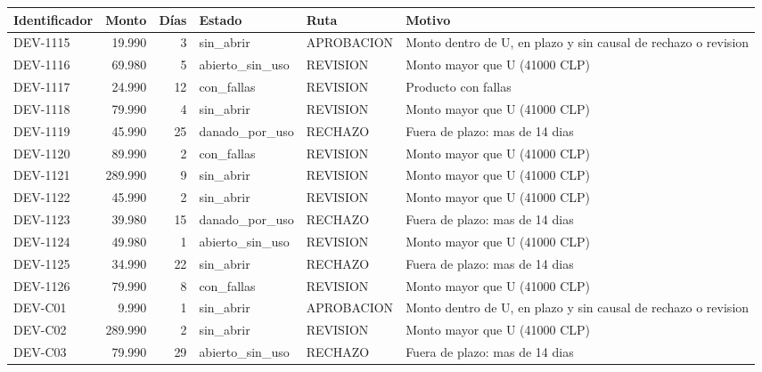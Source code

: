 \documentclass{article}
\begin{document}
\begin{center}
\footnotesize
\begin{tabular}{lrrllp{4.4cm}}
\toprule
Identificador & Monto & Días & Estado & Ruta & Motivo \\
\midrule
DEV-1115 & 19.990 & 3 & sin\_abrir & APROBACION & Monto dentro de U, en plazo y sin causal de rechazo o revision \\
DEV-1116 & 69.980 & 5 & abierto\_sin\_uso & REVISION & Monto mayor que U (41000 CLP) \\
DEV-1117 & 24.990 & 12 & con\_fallas & REVISION & Producto con fallas \\
DEV-1118 & 79.990 & 4 & sin\_abrir & REVISION & Monto mayor que U (41000 CLP) \\
DEV-1119 & 45.990 & 25 & danado\_por\_uso & RECHAZO & Fuera de plazo: mas de 14 dias \\
DEV-1120 & 89.990 & 2 & con\_fallas & REVISION & Monto mayor que U (41000 CLP) \\
DEV-1121 & 289.990 & 9 & sin\_abrir & REVISION & Monto mayor que U (41000 CLP) \\
DEV-1122 & 45.990 & 2 & sin\_abrir & REVISION & Monto mayor que U (41000 CLP) \\
DEV-1123 & 39.980 & 15 & danado\_por\_uso & RECHAZO & Fuera de plazo: mas de 14 dias \\
DEV-1124 & 49.980 & 1 & abierto\_sin\_uso & REVISION & Monto mayor que U (41000 CLP) \\
DEV-1125 & 34.990 & 22 & sin\_abrir & RECHAZO & Fuera de plazo: mas de 14 dias \\
DEV-1126 & 79.990 & 8 & con\_fallas & REVISION & Monto mayor que U (41000 CLP) \\
DEV-C01 & 9.990 & 1 & sin\_abrir & APROBACION & Monto dentro de U, en plazo y sin causal de rechazo o revision \\
DEV-C02 & 289.990 & 2 & sin\_abrir & REVISION & Monto mayor que U (41000 CLP) \\
DEV-C03 & 79.990 & 29 & abierto\_sin\_uso & RECHAZO & Fuera de plazo: mas de 14 dias \\
\bottomrule
\end{tabular}
\end{center}
\end{document}
